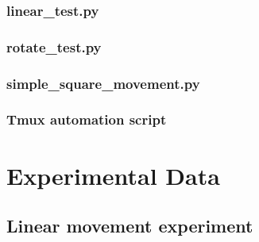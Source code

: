 \documentclass[a4paper, 12pt]{article}
\begin{document}
    \subsubsection{linear\_test.py}
    
    \pagebreak
    \subsubsection{rotate\_test.py}
    
    \pagebreak
    \subsubsection{simple\_square\_movement.py}
    
    \pagebreak
    \subsubsection{Tmux automation script} 
    

    \pagebreak


    \section{Experimental Data}

    \subsection{Linear movement experiment}
\end{document}
